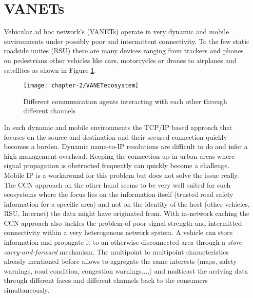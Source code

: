 \newpage
\section{VANETs}

Vehicular ad hoc network's (VANETs) operate in very dynamic and mobile environments under possibly poor and intermittent connectivity. To the few static roadside unites (RSU) there are many devices ranging from trackers and phones on pedestrians other vehicles like cars, motorcycles or drones to airplanes and satellites as shown in Figure \ref{fig:VANETecosystem}.

\begin{figure}[H]
  \centering
  \texttt{[image: chapter-2/VANETecosystem]}
  \caption{Different communication agents interacting with each other through different channels}
  \label{fig:VANETecosystem}
\end{figure}

In such dynamic and mobile environments the TCP/IP based approach that focuses on the source and destination and their secured connection quickly becomes a burden. Dynamic name-to-IP resolutions are difficult to do and infer a high management overhead. Keeping the connection up in urban areas where signal propagation is obstructed frequently can quickly become a challenge. Mobile IP is a workaround for this problem but does not solve the issue really. The CCN approach on the other hand seems to be very well suited for such ecosystems where the focus lies on the information itself (trusted road safety information for a specific area) and not on the identity of the host (other vehicles, RSU, Internet) the data might have originated from. With in-network caching the CCN approach also tackles the problem of poor signal strength and intermitted connectivity within a very heterogenous network system. A vehicle can store information and propagate it to an otherwise disconnected area through a \emph{store-carry-and-forward} mechanism. The multipoint to multipoint characteristics already mentioned before allows to aggregate the same interests (maps, safety warnings, road condition, congestion warnings....) and multicast the arriving data through different faces and different channels back to the consumers simultaneously.

\vspace{5mm} %

